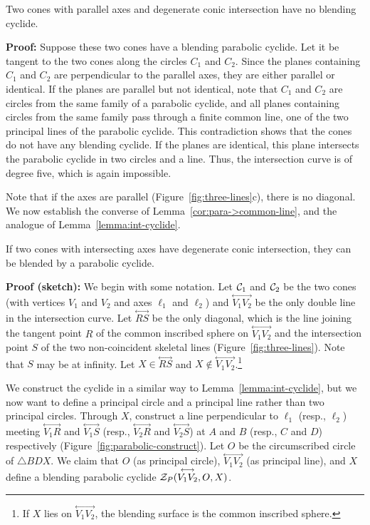\begin{cor}
\label{cor:no-cyclide-at-all}
Two cones with parallel axes and degenerate conic intersection 
have no blending cyclide.
\end{cor}
{\bf Proof:}  Suppose these two cones have a blending parabolic 
cyclide.  Let it be tangent to the two cones along the circles $C_1$ and $C_2$.
Since the planes containing $C_1$ and $C_2$ are perpendicular
to the parallel axes, they are either parallel or identical.
If the planes are parallel but not identical,
note that $C_1$ and $C_2$ are circles from the same family of a parabolic
cyclide, and all planes containing circles from the same family pass through
a finite common line, one of the two principal lines of the parabolic cyclide.
This contradiction shows that the cones do not have any blending cyclide.
If the planes are identical, this plane intersects the parabolic
cyclide in two circles and a line.  Thus, the intersection
curve is of degree five, which is again impossible. \QED

Note that if the axes are parallel (Figure~\ref{fig:three-lines}c),
there is no diagonal.  
We now establish the converse of Lemma~\ref{cor:para->common-line},
and the analogue of Lemma~\ref{lemma:int-cyclide}.

\begin{lemma}
\label{lemma:three-line-cyclide}
If two cones with intersecting axes have degenerate conic
intersection, they can be blended by a parabolic cyclide.
\end{lemma}
{\bf Proof (sketch):} 
We begin with some notation.
Let ${\cal C}_1$ and ${\cal C}_2$ be the two cones 
(with vertices $V_1$ and $V_2$ and axes $\ell_1$ and $\ell_2$) 
and $\stackrel{\longleftrightarrow}{V_1V_2}$ be the only double line in the
intersection curve.  
Let $\stackrel{\longleftrightarrow}{RS}$ be the only diagonal,
which is the 
line joining the tangent point $R$ of the common inscribed sphere on 
$\stackrel{\longleftrightarrow}{V_1V_2}$
and the intersection point $S$ of the two non-coincident skeletal lines
\cite{shene-johnstone:1991b} (Figure~\ref{fig:three-lines}).
Note that $S$ may be at infinity.  
Let $X\in\stackrel{\longleftrightarrow}{RS}$ and 
$X\not\in\stackrel{\longleftrightarrow}{V_1V_2}$.\footnote{If $X$ lies on
$\stackrel{\longleftrightarrow}{V_1V_2}$, the blending surface is the common
inscribed sphere.}

We construct the cyclide in a similar way to Lemma~\ref{lemma:int-cyclide},
but we now want to define a principal circle and a principal line rather
than two principal circles.
Through $X$, construct 
a line perpendicular to $\ell_1$ (resp., $\ell_2$) meeting
$\stackrel{\longleftrightarrow}{V_1R}$ and
$\stackrel{\longleftrightarrow}{V_1S}$ (resp.,
$\stackrel{\longleftrightarrow}{V_2R}$ and
$\stackrel{\longleftrightarrow}{V_2S}$) at $A$ and $B$ (resp., $C$ and $D$)
respectively (Figure~\ref{fig:parabolic-construct}).  
Let $O$ be the circumscribed circle of $\bigtriangleup BDX$.  
We claim that $O$ (as principal circle), 
$\stackrel{\longleftrightarrow}{V_1V_2}$ (as principal line), 
and $X$ define a blending
parabolic cyclide ${\cal Z}_P(\stackrel{\longleftrightarrow}{V_1V_2},O,X)$.

